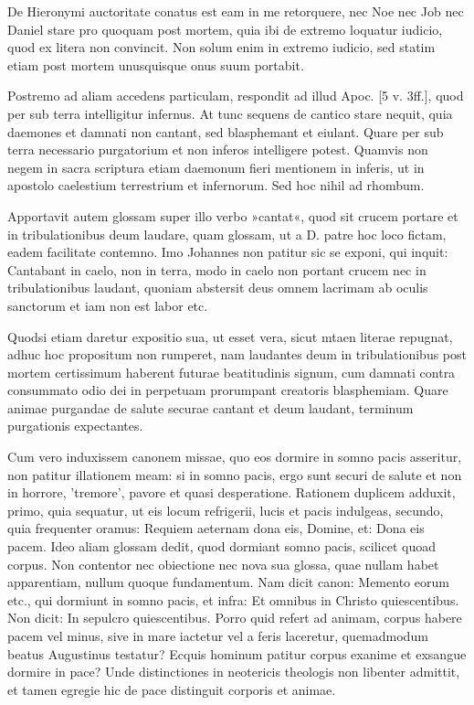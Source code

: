 De Hieronymi auctoritate conatus est eam in me retorquere, nec Noe nec Job nec Daniel stare pro quoquam post mortem, quia ibi de extremo loquatur iudicio, quod ex litera non convincit. Non solum enim in extremo iudicio, sed statim etiam post mortem unusquisque onus suum portabit.

Postremo ad aliam accedens particulam, respondit ad illud Apoc. [5 v. 3ff.], quod per sub terra intelligitur infernus. At tunc sequens de cantico stare nequit, quia daemones et damnati non cantant, sed blasphemant et eiulant. Quare per sub terra necessario purgatorium et non inferos intelligere potest. Quamvis non negem in sacra scriptura etiam daemonum fieri mentionem in inferis, ut in apostolo caelestium terrestrium et infernorum. Sed hoc nihil ad rhombum.

Apportavit autem glossam super illo verbo »cantat«, quod sit crucem portare et in tribulationibus deum laudare, quam glossam, ut a D. patre hoc loco fictam, eadem facilitate contemno. Imo Johannes non patitur sic se exponi, qui inquit: Cantabant in caelo, non in terra, modo in caelo non portant crucem nec in tribulationibus laudant, quoniam abstersit deus omnem lacrimam ab oculis sanctorum et iam non est labor etc.

Quodsi etiam daretur expositio sua, ut esset vera, sicut mtaen literae repugnat, adhuc hoc propositum non rumperet, nam laudantes deum in tribulationibus post mortem certissimum haberent futurae beatitudinis signum, cum damnati contra consummato odio dei in perpetuam prorumpant creatoris blasphemiam. \marginpar{\small[338]} Quare animae purgandae de salute securae cantant et deum laudant, terminum purgationis expectantes.

Cum vero induxissem canonem missae, quo eos dormire in somno pacis asseritur, non patitur illationem meam: si in somno pacis, ergo sunt securi de salute et non in horrore, 'tremore', pavore et quasi desperatione. Rationem duplicem adduxit, primo, quia sequatur, ut eis locum refrigerii, lucis et pacis indulgeas, secundo, quia frequenter oramus: Requiem aeternam dona eis, Domine, et: Dona eis pacem. Ideo aliam glossam dedit, quod dormiant somno pacis, scilicet quoad corpus. Non contentor nec obiectione nec nova sua glossa, quae nullam habet apparentiam, nullum quoque fundamentum. Nam dicit canon: Memento eorum etc., qui dormiunt in somno pacis, et infra: Et omnibus in Christo quiescentibus. Non dicit: In sepulcro quiescentibus. Porro quid refert ad animam, corpus habere pacem vel minus, sive in mare iactetur vel a feris laceretur, quemadmodum beatus Augustinus testatur? Ecquis hominum patitur corpus exanime et exsangue dormire in pace? Unde distinctiones in neotericis theologis non libenter admittit, et tamen egregie hic de pace distinguit corporis et animae.

